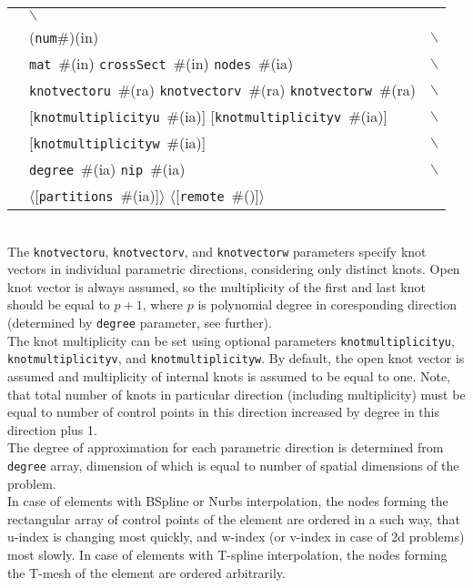 \documentclass[a4paper]{article}
\makeatletter
\newcommand{\param}[1]{\texttt{#1}} %
\newcommand{\optional}[1]{[#1]} %
\newcommand{\field}[2]{\param{#1}~\#{\tiny(#2)}} %
\newcommand{\optField}[2]{\optional{\field{#1}{#2}}}
\newcommand{\componentNum}{(\param{num}\#){\tiny(in)}} %
\newcommand{\entKeyword}[1]{*\textbf{#1}} %
\renewcommand{\parallel}[1]{$\langle${#1}$\rangle$}
\newcommand{\PoptField      }[2]{\parallel{\optField{#1}{#2}}}
\newcounter{rcc}
\newenvironment{record}[1][\textwidth]{\setcounter{rcc}{0}\begin{tabular*}{#1}{|ll@{\extracolsep{\fill}}r}}{\end{tabular*}\\}
\newcommand{\recentry}[2]{\ifthenelse{\value{rcc}>0}{&$\backslash$ \\}{\setcounter{rcc}{1}}{#1}&{#2}}
\makeatother
\begin{document}
\noindent
\begin{record}
  \recentry{\entKeyword{IGAElement}}{\componentNum}
  \recentry{}{\field{mat}{in} \field{crossSect}{in} \field{nodes}{ia}}
  \recentry{}{\field{knotvectoru}{ra} \field{knotvectorv}{ra} \field{knotvectorw}{ra}}
  \recentry{}{\optField{knotmultiplicityu}{ia} \optField{knotmultiplicityv}{ia}}
  \recentry{}{\optField{knotmultiplicityw}{ia}}
  \recentry{}{\field{degree}{ia} \field{nip}{ia}}
  \recentry{}{\PoptField{partitions}{ia} \PoptField{remote}{}}
\end{record}
The \param{knotvectoru}, \param{knotvectorv}, and \param{knotvectorw} parameters specify  knot vectors in individual parametric directions, considering only distinct knots. Open knot vector is always assumed, so the multiplicity of the first and last knot should be equal to $p+1$, where $p$ is polynomial degree in coresponding direction (determined by \param{degree} parameter, see further).\\
The knot multiplicity can be set using optional parameters \param{knotmultiplicityu}, \param{knotmultiplicityv}, and \param{knotmultiplicityw}. By default, the open knot vector is assumed and multiplicity of internal knots is assumed to be equal to one. Note, that total number of knots in particular direction (including multiplicity) must be equal to number of control points in this direction increased by degree in this direction plus 1.\\
The degree of approximation for each parametric direction is determined from \param{degree} array, dimension of which is equal to number of spatial dimensions of the problem.\\
In case of elements with BSpline or Nurbs interpolation, the nodes forming the rectangular array of control points of the element are ordered in a such way, that u-index is changing most quickly, and w-index (or v-index in case of 2d problems) most slowly. In case of elements with T-spline interpolation, the nodes forming the T-mesh of the element are ordered arbitrarily.
\end{document}
